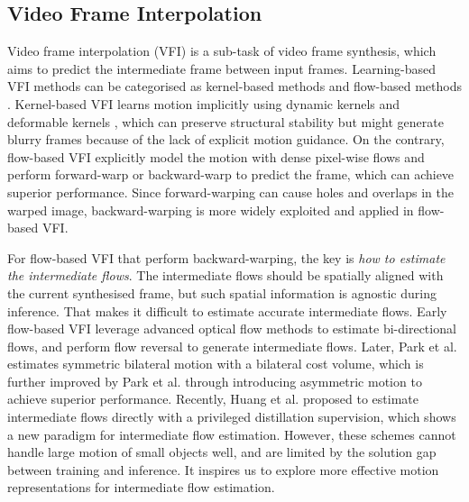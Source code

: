\documentclass[sigconf]{acmart}
\begin{document}
\subsection{Video Frame Interpolation}
Video frame interpolation (VFI) is a sub-task of video frame synthesis, which aims to predict the intermediate frame between input frames. Learning-based VFI methods can be categorised as kernel-based methods \cite{niklaus2017video, lee2020adacof} and flow-based methods \cite{liu2017video, jiang2018super, bao2019memc, park2020bmbc, park2021asymmetric, huang2020rife}. Kernel-based VFI learns motion implicitly using dynamic kernels \cite{niklaus2017video} and deformable kernels \cite{lee2020adacof}, which can preserve structural stability but might generate blurry frames because of the lack of explicit motion guidance. On the contrary, flow-based VFI explicitly model the motion with dense pixel-wise flows and perform forward-warp \cite{niklaus2018context,niklaus2020softmax} or backward-warp \cite{jiang2018super,park2020bmbc, park2021asymmetric, huang2020rife} to predict the frame, which can achieve superior performance. Since forward-warping can cause holes and overlaps in the warped image, backward-warping is more widely exploited and applied in flow-based VFI.

For flow-based VFI that perform backward-warping, the key is \textit{how to estimate the intermediate flows}. The intermediate flows should be spatially aligned with the current synthesised frame, but such spatial information is agnostic during inference. That makes it difficult to estimate accurate intermediate flows. Early flow-based VFI leverage advanced optical flow methods \cite{ranjan2017optical, sun2018pwc, teed2020raft, jiang2021learning} to estimate bi-directional flows, and perform flow reversal to generate intermediate flows. Later, Park et al. \cite{park2020bmbc} estimates symmetric bilateral motion with a bilateral cost
volume, which is further improved by Park et al. \cite{park2021asymmetric} through introducing asymmetric motion to achieve superior performance. Recently, Huang et al. \cite{huang2020rife} proposed to estimate intermediate flows directly with a privileged distillation supervision, which shows a new paradigm for intermediate flow estimation. However, these schemes cannot handle large motion of small objects well, and are limited by the solution gap between training and inference. It inspires us to explore more effective motion representations for intermediate flow estimation.
\end{document}
